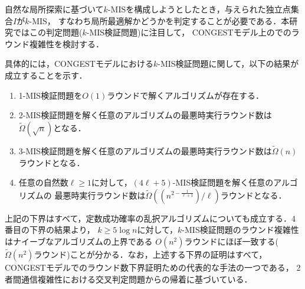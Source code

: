 \documentclass[12pt]{thesis}
\newcommand{\CONGEST}{\textsf{CONGEST}}
\theoremstyle{definition}
\begin{document}
自然な局所探索に基づいて$k$-MISを構成しようとしたとき，与えられた独立点集合$I$が$k$-MIS，
すなわち局所最適解かどうかを判定することが必要である．本研究ではこの判定問題($k$-MIS検証問題)に注目して，
{\CONGEST}モデル上のでのラウンド複雑性を検討する．

具体的には，{\CONGEST}モデルにおける$k$-MIS検証問題に関して，以下の結果が成立することを示す．
\begin{enumerate}
\item 1-MIS検証問題を$O(1)$ラウンドで解くアルゴリズムが存在する．
\item 2-MIS検証問題を解く任意のアルゴリズムの最悪時実行ラウンド数は$\tilde{\Omega} (\sqrt{n})$となる．
\item 3-MIS検証問題を解く任意のアルゴリズムの最悪時実行ラウンド数は$\tilde{\Omega}(n)$ラウンドとなる．
\item 任意の自然数$\ell \geq 1$に対して，$(4\ell + 5)$-MIS検証問題を解く任意のアルゴリズムの
最悪時実行ラウンド数は$\tilde{\Omega}\left((n^{2 - \frac{1}{\ell+1}})/\ell\right)$ラウンドとなる．
\end{enumerate}

上記の下界はすべて，定数成功確率の乱択アルゴリズムについても成立する．4番目の下界の結果より，
$k\geq 5\log n$に対して，$k$-MIS検証問題のラウンド複雑性はナイーブなアルゴリズムの上界である
$O(n^2)$ラウンドにほぼ一致する($\tilde{\Omega}(n^2)$ラウンド)ことが分かる．なお，上述する下界の証明はすべて，
{\CONGEST}モデルでのラウンド数下界証明ための代表的な手法の一つである，
2者間通信複雑性における交叉判定問題からの帰着に基づいている．
\end{document}
